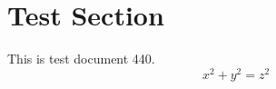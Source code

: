\documentclass{article}
\begin{document}
\section{Test Section}
This is test document 440.
\begin{equation}
x^2 + y^2 = z^2
\end{equation}
\end{document}
